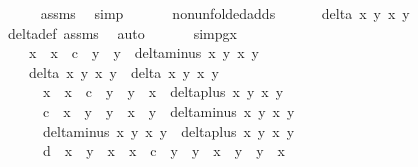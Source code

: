 \begin{isabellebody}
\ \ \ \ \isamarkupfalse%
\ assms{\isacharparenleft}{}{\isacharcomma}{}{\isacharparenright}\ \isamarkupfalse%
\ simp\isanewline
\ \ \isanewline
\ \ \isamarkupfalse%
\ non{\isacharunderscore}unfolded{\isacharunderscore}adds{\isacharcolon}\isanewline
\ \ \ \ \ \ {\isachardoublequoteopen}delta\ x{}\ y{}\ x{}\ y{}\ {\isasymnoteq}\ {}{\isachardoublequoteclose}\ \isamarkupfalse%
\ delta{\isacharunderscore}def\ assms{\isacharparenleft}{}{\isacharcomma}{}{\isacharparenright}\ \isamarkupfalse%
\ auto\isanewline
\ \ \isanewline
\ \ \isamarkupfalse%
\ simp{}gx{\isacharcolon}\ {\isachardoublequoteopen}\isanewline
\ \ \ \ {\isacharparenleft}x{}{\isacharprime}\ {\isacharasterisk}\ x{}\ {\isacharminus}\ c\ {\isacharasterisk}\ y{}{\isacharprime}\ {\isacharasterisk}\ y{}{\isacharparenright}\ {\isacharasterisk}\ delta{\isacharunderscore}minus\ x{}\ y{}\ x{}{\isacharprime}\ y{}{\isacharprime}\ {\isacharasterisk}\ \isanewline
\ \ \ \ {\isacharparenleft}delta\ x{}\ y{}\ x{}\ y{}\ {\isacharasterisk}\ delta\ x{}\ y{}\ x{}\ y{}{\isacharparenright}\ {\isacharequal}\ \isanewline
\ \ \ \ \ \ {\isacharparenleft}{\isacharparenleft}x{}\ {\isacharasterisk}\ x{}\ {\isacharminus}\ c\ {\isacharasterisk}\ y{}\ {\isacharasterisk}\ y{}{\isacharparenright}\ {\isacharasterisk}\ x{}\ {\isacharasterisk}\ delta{\isacharunderscore}plus\ x{}\ y{}\ x{}\ y{}\ {\isacharminus}\ \isanewline
\ \ \ \ \ \ c\ {\isacharasterisk}\ {\isacharparenleft}x{}\ {\isacharasterisk}\ y{}\ {\isacharplus}\ y{}\ {\isacharasterisk}\ x{}{\isacharparenright}\ {\isacharasterisk}\ y{}\ {\isacharasterisk}\ delta{\isacharunderscore}minus\ x{}\ y{}\ x{}\ y{}{\isacharparenright}\ {\isacharasterisk}\isanewline
\ \ \ \ \ \ {\isacharparenleft}delta{\isacharunderscore}minus\ x{}\ y{}\ x{}\ y{}\ {\isacharasterisk}\ delta{\isacharunderscore}plus\ x{}\ y{}\ x{}\ y{}\ {\isacharminus}\ \isanewline
\ \ \ \ \ \ d\ {\isacharasterisk}\ x{}\ {\isacharasterisk}\ y{}\ {\isacharasterisk}\ {\isacharparenleft}x{}\ {\isacharasterisk}\ x{}\ {\isacharminus}\ c\ {\isacharasterisk}\ y{}\ {\isacharasterisk}\ y{}{\isacharparenright}\ {\isacharasterisk}\ {\isacharparenleft}x{}\ {\isacharasterisk}\ y{}\ {\isacharplus}\ y{}\ {\isacharasterisk}\ x{}{\isacharparenright}{\isacharparenright}\isanewline

\end{isabellebody}
